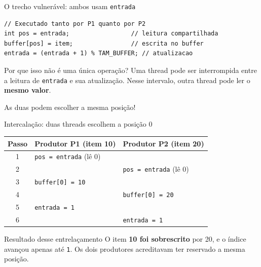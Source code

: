 \documentclass[aspectratio=169,11pt]{beamer}
\newcommand{\caixa}[3]{%
\node[draw=#3,very thick,minimum width=1.45cm,minimum height=1.15cm,
  fill=#3!8,font=\Large\bfseries] at (#1,0) {#2};
\node[below=0.72cm,font=\footnotesize\color{cinza}] at (#1,0) {#1};}
\begin{document}
\begin{frame}[fragile]{O trecho vulnerável: ambos usam \texttt{entrada}}
\begin{lstlisting}
// Executado tanto por P1 quanto por P2
int pos = entrada;                 // leitura compartilhada
buffer[pos] = item;                // escrita no buffer
entrada = (entrada + 1) % TAM_BUFFER; // atualizacao
\end{lstlisting}
\vspace{.7em}
\begin{block}{Por que isso não é uma única operação?}
Uma thread pode ser interrompida entre a leitura de \texttt{entrada} e sua atualização. Nesse intervalo, outra thread pode ler o \textbf{mesmo valor}.
\end{block}
\begin{center}
\large\textcolor{vermelhoerro}{As duas podem escolher a mesma posição!}
\end{center}
\end{frame}

\begin{frame}{Intercalação: duas threads escolhem a posição 0}
\small
\begin{center}
\begin{tabular}{c p{4.1cm} p{4.1cm}}
\toprule
\textbf{Passo} & \textbf{Produtor P1 (item 10)} & \textbf{Produtor P2 (item 20)}\\
\midrule
1 & \texttt{pos = entrada} (lê 0) & \\
2 & & \texttt{pos = entrada} (lê 0) \\
3 & \texttt{buffer[0] = 10} & \\
4 & & \texttt{buffer[0] = 20} \\
5 & \texttt{entrada = 1} & \\
6 & & \texttt{entrada = 1} \\
\bottomrule
\end{tabular}
\end{center}
\vspace{.5em}
\vspace{.35em}
\begin{alertblock}{Resultado desse entrelaçamento}
O item \textbf{10 foi sobrescrito} por 20, e o índice avançou apenas até \texttt{1}. Os dois produtores acreditavam ter reservado a mesma posição.
\end{alertblock}
\end{frame}
\end{document}
